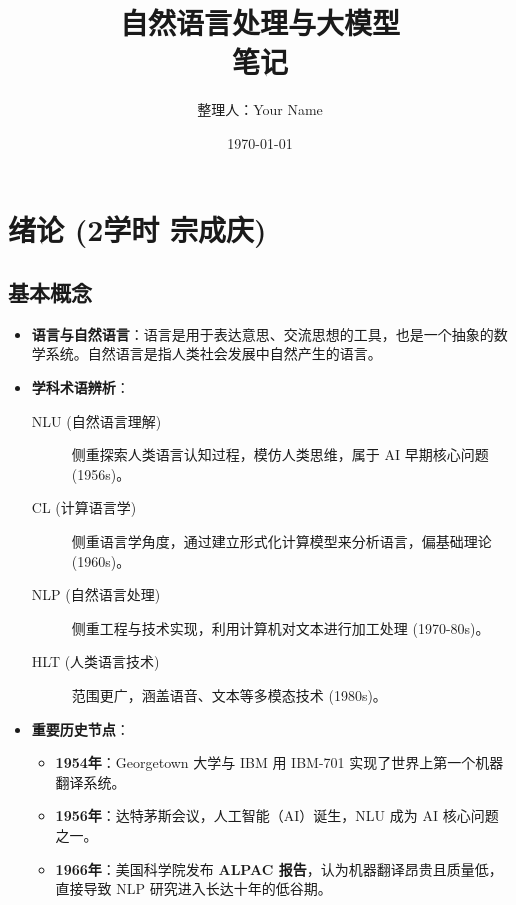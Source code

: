 \documentclass[a4paper, 11pt]{ctexart}
\title{\textbf{自然语言处理与大模型 \\ 笔记}}
\author{整理人：Your Name}
\date{\today}
\begin{document}
\maketitle
\tableofcontents

\section{绪论 \small{(2学时 宗成庆)}}

\subsection{基本概念}
\begin{itemize}
    \item \textbf{语言与自然语言}：语言是用于表达意思、交流思想的工具，也是一个抽象的数学系统。自然语言是指人类社会发展中自然产生的语言。
    \item \textbf{学科术语辨析}：
    \begin{description}
        \item[NLU (自然语言理解)] 侧重探索人类语言认知过程，模仿人类思维，属于 AI 早期核心问题 (1956s)。
        \item[CL (计算语言学)] 侧重语言学角度，通过建立形式化计算模型来分析语言，偏基础理论 (1960s)。
        \item[NLP (自然语言处理)] 侧重工程与技术实现，利用计算机对文本进行加工处理 (1970-80s)。
        \item[HLT (人类语言技术)] 范围更广，涵盖语音、文本等多模态技术 (1980s)。
    \end{description}
    \item \textbf{重要历史节点}：
    \begin{itemize}
        \item \textbf{1954年}：Georgetown 大学与 IBM 用 IBM-701 实现了世界上第一个机器翻译系统。
        \item \textbf{1956年}：达特茅斯会议，人工智能（AI）诞生，NLU 成为 AI 核心问题之一。
        \item \textbf{1966年}：美国科学院发布 \textbf{ALPAC 报告}，认为机器翻译昂贵且质量低，直接导致 NLP 研究进入长达十年的低谷期。
    \end{itemize}
\end{itemize}
\end{document}
